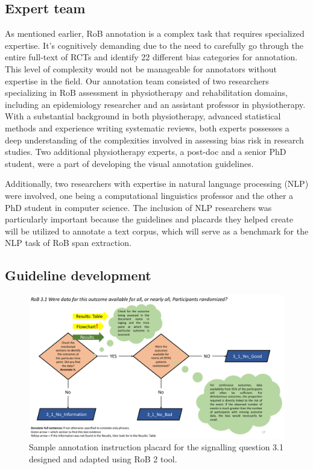 \documentclass[sn-mathphys,Numbered]{sn-jnl}%
\theoremstyle{thmstyleone}%
\theoremstyle{thmstyletwo}%
\theoremstyle{thmstylethree}%
\begin{document}
\subsection{Expert team}
\label{experts}
%
As mentioned earlier, RoB annotation is a complex task that requires specialized expertise.
It's cognitively demanding due to the need to carefully go through the entire full-text of RCTs and identify 22 different bias categories for annotation.
This level of complexity would not be manageable for annotators without expertise in the field.
Our annotation team consisted of two researchers specializing in RoB assessment in physiotherapy and rehabilitation domains, including an epidemiology researcher and an assistant professor in physiotherapy.
With a substantial background in both physiotherapy, advanced statistical methods and experience writing systematic reviews, both experts possesses a deep understanding of the complexities involved in assessing bias risk in research studies.
Two additional physiotherapy experts, a post-doc and a senior PhD student, were a part of developing the visual annotation guidelines.


Additionally, two researchers with expertise in natural language processing (NLP) were involved, one being a computational linguistics professor and the other a PhD student in computer science.
The inclusion of NLP researchers was particularly important because the guidelines and placards they helped create will be utilized to annotate a text corpus, which will serve as a benchmark for the NLP task of RoB span extraction.
%
%
%
\subsection{Guideline development}
\label{guidelines}
%
%
%
%
\begin{figure}
    \centering
    \includegraphics[width=0.80\columnwidth]{figures/placard_3_1.pdf}
    \caption{Sample annotation instruction placard for the signalling question 3.1 designed and adapted using RoB 2 tool.}
    \label{fig:placard}
\end{figure}
%
%
%
\end{document}
